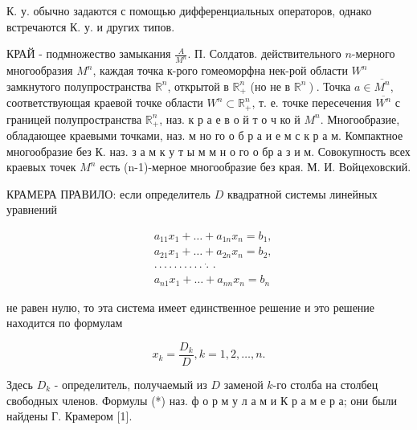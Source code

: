 \documentclass[10pt]{article}
\begin{document}
К. у. обычно задаются с помощью дифференциальных операторов, однако встречаются К. у. и других типов.



КРАЙ - подмножество замыкания $\frac{A}{M^{n}}$. П. Солдатов. действительного $n$-мерного многообразия $M^{n}$, каждая точка к-рого гомеоморфна нек-рой области $W^{n}$ замкнутого полупространства $\mathbb{R}^{n}$, открытой в $\mathbb{R}_{+}^{n}$ (но не в $\left.\mathbb{R}^{n}\right)$. Точка $a \in \overline{M^{n}}$, соответствующая краевой точке области $W^{n} \subset \mathbb{R}_{+}^{n}$, т. е. точке пересечения $\overline{W^{n}}$ с границей полупространства $\mathbb{R}_{+}^{n}$, наз. к р а е в о й т о ч ко й $M^{n}$. Многообразие, обладающее краевыми точками, наз. м но го о б р а и е м с к р а м. Компактное многообразие без $К$. наз. з а м к у т ы м м н о го о бр а з и м. Совокупность всех краевых точек $M^{n}$ есть (n-1)-мерное многообразие без края. М. И. Войцеховский.



КРАМЕРА ПРАВИЛО: если определитель $D$ квадратной системы линейных уравнений



\[

\begin{aligned}

& a_{11} x_{1}+\ldots+a_{1 n} x_{n}=b_{1}, \\

& a_{21} x_{1}+\ldots+a_{2 n} x_{n}=b_{2}, \\

& \cdot \cdot \cdot \cdot \cdot \cdot \cdot \cdot \cdot \cdot \dot{\cdot} \cdot \\

& a_{n 1} x_{1}+\ldots+a_{n n} x_{n}=b_{n}

\end{aligned}

\]



не равен нулю, то эта система имеет единственное решение и это решение находится по формулам



\[

x_{k}=\frac{D_{k}}{D}, k=1,2, \ldots, n .

\]



Здесь $D_{k}$ - определитель, получаемый из $D$ заменой $k$-го столба на столбец свободных членов. Формулы (*) наз. ф о р м у л а м и К р а м е р а; они были найдены Г. Крамером [1].
\end{document}
